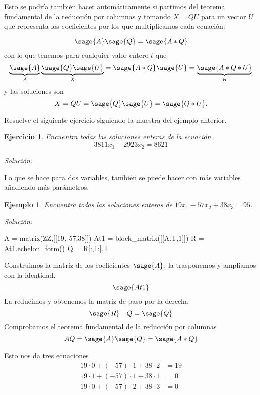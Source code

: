 \documentclass{amsart}
\newtheorem{ejer}{Ejercicio}
\newtheorem{ejem}{Ejemplo}
\begin{document}
Esto se podría también hacer automáticamente si partimos del teorema
fundamental de la reducción por columnas y tomando $X = QU$ para un vector
$U$ que representa los coeficientes por los que multiplicamos cada ecuación:

$$ \sage{A} \sage{Q} = \sage{A*Q} $$
con lo que tenemos para cualquier valor entero $t$ que 
$$ \underbrace{\sage{A}}_{A} \underbrace{\sage{Q} \sage{U}}_{X} = \sage{A*Q} \sage{U} = \underbrace{\sage{A*Q*U}}_{B}$$
y las soluciones son
$$ X = QU = \sage{Q}\sage{U} = \sage{Q*U}.$$


\vspace{1cm}

Resuelve el siguiente ejercicio siguiendo la muestra del ejemplo anterior.

\begin{ejer}
Encuentra todas las soluciones enteras de la ecuación
$$ 3811 x_1 + 2923 x_2 = 8621$$
\end{ejer}

{\it Solución:}



Lo que se hace para dos variables, también se puede hacer con más variables
añadiendo más parámetros.

\begin{ejem}
Encuentra todas las soluciones enteras de $19x_1-57x_2+38x_3 = 95$.
\end{ejem}

{\it Solución:}

\begin{sageblock}
A = matrix(ZZ,[[19,-57,38]])
At1 = block_matrix([[A.T,1]])
R = At1.echelon_form()
Q = R[:,1:].T
\end{sageblock}

Construimos la matriz de los coeficientes $\sage{A}$, la trasponemos 
y ampliamos con la identidad.
$$ \sage{At1}$$
La reducimos y obtenemos la matriz de paso por la derecha
$$ \sage{R} \quad Q = \sage{Q}$$
Comprobamos el teorema fundamental de la reducción por columnas
$$ AQ = \sage{A} \sage{Q} = \sage{A*Q} $$

Esto nos da tres ecuaciones
\begin{align*}
19 \cdot 0 + (-57) \cdot 1 + 38 \cdot 2 &= 19 \\
19 \cdot 1 + (-57) \cdot 1 + 38 \cdot 1 &= 0 \\
19 \cdot 0 + (-57) \cdot 2 + 38 \cdot 3 &= 0 \\
\end{align*}
\end{document}

